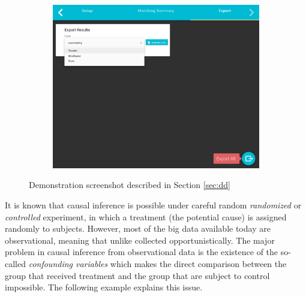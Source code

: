 \begin{figure}[t]
\begin{subfigure}{0.33\linewidth}
  \end{subfigure}\hfill
  \begin{subfigure}{0.33\linewidth}
    \centering
    \hspace{-.6cm}
    \includegraphics[scale=0.13]{Figures/Export.png}
    \caption{\scriptsize }
    \label{sfig:testcc}
  \end{subfigure}\hfill
\caption{Demonstration screenshot described in Section \ref{sec:dd} }
\label{fig:inteface}
\vspace{-0.3cm}
\end{figure}


It is known that causal inference is possible under careful random \emph{randomized} or \emph{controlled} experiment, in which a treatment (the potential cause) is assigned randomly to subjects. However, most of the big data available today are observational, meaning that unlike collected opportunistically. The major problem in causal inference from observational data is the existence of the so-called {\em confounding variables} which makes the direct comparison between the group that received treatment and the group that are subject to control impossible. The following example explains this issue.



